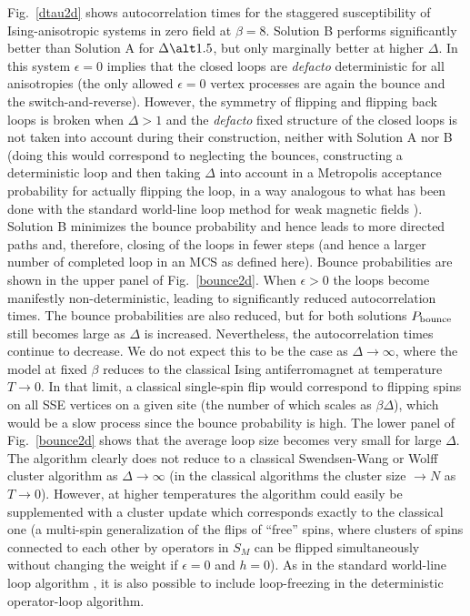 \documentclass[10pt,pre,aps,twocolumn,showpacs,superscriptaddress,
floatfix]{revtex4}
\begin{document}
Fig.~\ref{dtau2d} shows autocorrelation times for the staggered susceptibility
of Ising-anisotropic systems in zero field at $\beta=8$. Solution B performs
significantly better than Solution A for $\Delta \alt 1.5$, but only marginally
better at higher $\Delta$. In this system $\epsilon = 0$ implies that the
closed loops are {\it defacto} deterministic for all anisotropies (the only 
allowed $\epsilon=0$ vertex processes are again the bounce and the 
switch-and-reverse). 
However, the symmetry of flipping and flipping back loops is 
broken when $\Delta > 1$ and the {\it defacto} fixed structure of the closed 
loops is not taken into account during their construction, neither with 
Solution A nor B (doing this would correspond to neglecting the bounces,
constructing a deterministic loop and then taking $\Delta$ into account in 
a Metropolis acceptance probability for actually flipping the loop, in a way 
analogous to what has been done with the standard world-line loop method for 
weak magnetic fields \cite{troyer}). Solution B minimizes the bounce 
probability and hence leads to more directed paths and, therefore, closing of 
the loops in fewer steps (and hence a larger number of completed loop in an 
MCS as defined here). Bounce probabilities are shown in the upper panel of 
Fig.~\ref{bounce2d}. When $\epsilon> 0$ the loops become manifestly 
non-deterministic, leading to 
significantly reduced autocorrelation times. The bounce probabilities are also
reduced, but for both solutions $P_{\rm bounce}$ still becomes large as 
$\Delta$ is increased. Nevertheless, the autocorrelation times continue to 
decrease. We do not expect this to be the case as $\Delta\to \infty$, where 
the model at fixed $\beta$ reduces to the classical Ising antiferromagnet 
at temperature $T\to 0$. In that limit, a classical single-spin flip would 
correspond to flipping spins on all SSE vertices on a given site (the number 
of which scales as $\beta\Delta$), which would be a slow process since the 
bounce probability is high. The lower panel of Fig.~\ref{bounce2d} shows 
that the average loop size becomes very small for large $\Delta$. The 
algorithm clearly does not reduce to a classical Swendsen-Wang or Wolff 
cluster algorithm as $\Delta\to \infty$ (in the classical algorithms the 
cluster size $\to N$ as $T\to 0$). However, at higher temperatures the 
algorithm could easily be supplemented with a cluster update which corresponds
exactly to the classical one (a multi-spin generalization of the flips of 
``free'' spins, where clusters of spins connected to each other by operators 
in $S_M$ can be flipped simultaneously without changing the weight if 
$\epsilon=0$ and $h=0$). As in the standard world-line loop algorithm
\cite{evertzchapter}, it is also possible to include loop-freezing in the 
deterministic operator-loop algorithm.
\end{document}
